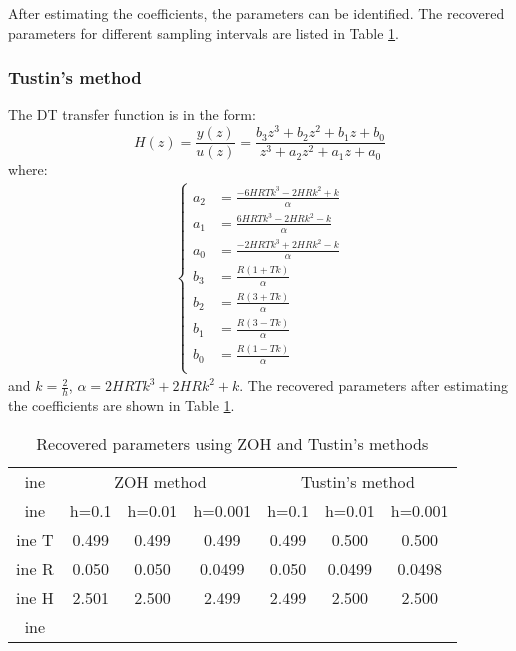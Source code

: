 \documentclass[10pt,journal,final]{IEEEtran}
\begin{document}
After estimating the coefficients, the parameters can be identified. The recovered parameters for different sampling intervals are listed in Table \ref{tab:angle}.
\subsubsection{{Tustin's method}} {The DT transfer function is in the form:
\begin{equation}\label{Zfordelta}
H(z)=\frac{y(z)}{u(z)}=\frac{b_{3}z^{3}+b_{2}z^{2}+b_{1}z+b_{0}}{z^{3}+a_{2}z^{2}+a_{1}z+a_{0}}
\end{equation}
where:
\begin{align}
\begin{cases}
a_{2}&=\frac{-6HRTk^3-2HRk^2+k}{\alpha}\\
a_{1}&=\frac{6HRTk^3-2HRk^2-k}{\alpha}\\
a_{0}&=\frac{-2HRTk^3+2HRk^2-k}{\alpha}\\
b_{3}&=\frac{R(1+Tk)}{\alpha}\\
b_{2}&=\frac{R(3+Tk)}{\alpha}\\
b_{1}&=\frac{R(3-Tk)}{\alpha}\\
b_{0}&=\frac{R(1-Tk)}{\alpha}\\
\end{cases}
\end{align}
and $k=\frac{2}{h}$, $\alpha=2HRTk^3+2HRk^2+k$. The recovered parameters after estimating the coefficients are shown in Table \ref{tab:angle}.}
\begin{table}[h]
\centering
\caption{Recovered parameters using ZOH and Tustin's methods}
\label{tab:angle}
\begin{tabular}{|c|c|c|c|c|c|c|}
ine
  & \multicolumn{3}{c|}{ZOH method} & \multicolumn{3}{c|}{{Tustin's method}} \\ ine
  & h=0.1    & h=0.01   & h=0.001   & {h=0.1}     & {h=0.01}     & {h=0.001}     \\ ine
T & 0.499    & 0.499    & 0.499     & {0.499}     & {0.500}      & {0.500}       \\ ine
R & 0.050    & 0.050    & 0.0499    & {0.050}     & {0.0499}     & {0.0498}      \\ ine
H & 2.501    & 2.500    & 2.499     & {2.499}     & {2.500}      & {2.500}       \\ ine
\end{tabular}
\end{table}
\end{document}
